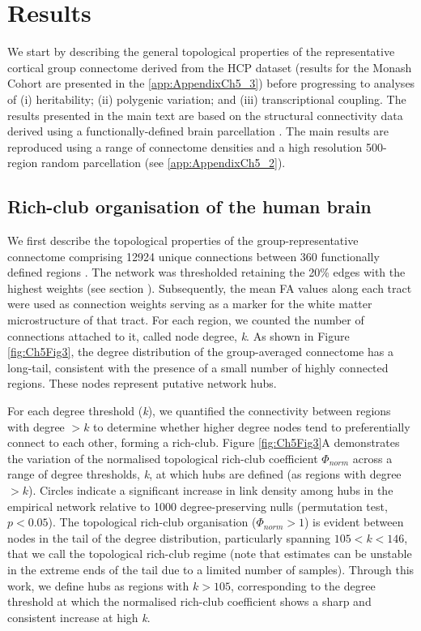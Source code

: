 \section{Results}

We start by describing the general topological properties of the representative cortical group connectome derived from the HCP dataset (results for the Monash Cohort are presented in the \ref{app:AppendixCh5_3}) before progressing to analyses of (i) heritability; (ii) polygenic variation; and (iii) transcriptional coupling. The results presented in the main text are based on the structural connectivity data derived using a functionally-defined brain parcellation \citep{Glasser2016}. The main results are reproduced using a range of connectome densities and a high resolution 500-region random parcellation (see \ref{app:AppendixCh5_2}).

\subsection{Rich-club organisation of the human brain}

We first describe the topological properties of the group-representative connectome comprising \num{12924} unique connections between 360 functionally defined regions \citep{Glasser2016}. The network was thresholded retaining the 20\% edges with the highest weights (see section ). Subsequently, the mean FA values along each tract were used as connection weights serving as a marker for the white matter microstructure of that tract. For each region, we counted the number of connections attached to it, called node degree, \textit{k}. As shown in Figure \ref{fig:Ch5Fig3}, the degree distribution of the group-averaged connectome has a long-tail, consistent with the presence of a small number of highly connected regions. These nodes represent putative network hubs.

For each degree threshold (\textit{k}), we quantified the connectivity between regions with degree $> k$ to determine whether higher degree nodes tend to preferentially connect to each other, forming a rich-club. Figure \ref{fig:Ch5Fig3}A demonstrates the variation of the normalised topological rich-club coefficient $\Phi_{norm}$ across a range of degree thresholds, \textit{k}, at which hubs are defined (as regions with degree $> k$). Circles indicate a significant increase in link density among hubs in the empirical network relative to 1000 degree-preserving nulls (permutation test, $p < 0.05$). The topological rich-club organisation ($\Phi_{norm} >1$) is evident between nodes in the tail of the degree distribution, particularly spanning $105< k <146$, that we call the topological rich-club regime (note that estimates can be unstable in the extreme ends of the tail due to a limited number of samples). Through this work, we define hubs as regions with $k > 105$, corresponding to the degree threshold at which the normalised rich-club coefficient shows a sharp and consistent increase at high \textit{k}.

